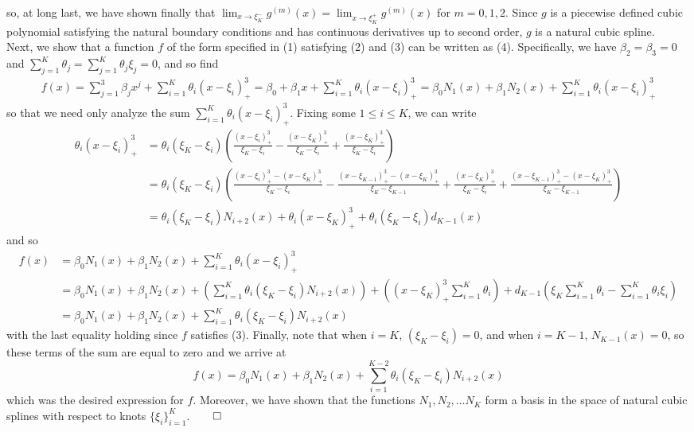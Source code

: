 \documentclass[10pt]{article}
\newcommand{\bp}[1]{\left({#1}\right)}
\newcommand{\1}[1]{\mathbbm{1}_{#1}}
\begin{document}
    so, at long last, we have shown finally that $\lim_{x\rightarrow\xi_K^-}g^{(m)}(x)=\lim_{x\rightarrow\xi_K^+}g^{(m)}(x)$ for $m=0,1,2$. Since $g$ is a piecewise defined cubic polynomial satisfying the natural boundary conditions and has continuous derivatives up to second order, $g$
    is a natural cubic spline.\\[5pt]
    Next, we show that a function $f$ of the form specified in (1) satisfying (2) and (3) can be written as (4). Specifically, we have $\beta_2=\beta_3=0$ and $\sum_{j=1}^K\theta_j=\sum_{j=1}^K\theta_j\xi_j=0$, and so find
    \begin{align*}
        f(x)=\sum_{j=1}^3\beta_jx^j+\sum_{i=1}^K\theta_i(x-\xi_i)^3_+=\beta_0+\beta_1x+\sum_{i=1}^K\theta_i(x-\xi_i)^3_+=\beta_0N_1(x)+\beta_1N_2(x)+\sum_{i=1}^K\theta_i(x-\xi_i)^3_+
    \end{align*}
    so that we need only analyze the sum $\sum_{i=1}^K\theta_i(x-\xi_i)^3_+$. Fixing some $1\leq i\leq K$, we can write
    \begin{align*}
        \theta_i(x-\xi_i)^3_+&=\theta_i(\xi_K-\xi_i)\bp{\frac{(x-\xi_i)^3_+}{\xi_K-\xi_i}-\frac{(x-\xi_K)^3_+}{\xi_K-\xi_{i}}+\frac{(x-\xi_K)^3_+}{\xi_K-\xi_i}}\\
        &=\theta_i(\xi_K-\xi_i)\bp{\frac{(x-\xi_i)^3_+-(x-\xi_K)^3_+}{\xi_K-\xi_i}-\frac{(x-\xi_{K-1})^3_+-(x-\xi_K)^3_+}{\xi_K-\xi_{K-1}}+\frac{(x-\xi_K)^3_+}{\xi_K-\xi_i}+\frac{(x-\xi_{K-1})^3_+-(x-\xi_K)^3_+}{\xi_K-\xi_{K-1}}}\\
        &=\theta_i(\xi_K-\xi_i)N_{i+2}(x)+\theta_i(x-\xi_K)^3_++\theta_i(\xi_K-\xi_i)d_{K-1}(x)
    \end{align*}
    and so
    \begin{align*}
        f(x)&=\beta_0N_1(x)+\beta_1N_2(x)+\sum_{i=1}^K\theta_i(x-\xi_i)^3_+\\
        &=\beta_0N_1(x)+\beta_1N_2(x)+\bp{\sum_{i=1}^K\theta_i(\xi_K-\xi_i)N_{i+2}(x)}+\bp{(x-\xi_K)^3_+\sum_{i=1}^K\theta_i}+d_{K-1}\bp{\xi_K\sum_{i=1}^K\theta_i-\sum_{i=1}^K\theta_i\xi_i}\\
        &=\beta_0N_1(x)+\beta_1N_2(x)+\sum_{i=1}^K\theta_i(\xi_K-\xi_i)N_{i+2}(x)
    \end{align*}
    with the last equality holding since $f$ satisfies (3). Finally, note that when $i=K$, $(\xi_K-\xi_i)=0$, and when $i=K-1$, $N_{K-1}(x)=0$, so these terms of the sum are equal to zero and we arrive at
    \[f(x)=\beta_0N_1(x)+\beta_1N_2(x)+\sum_{i=1}^{K-2}\theta_i(\xi_K-\xi_i)N_{i+2}(x)\]
    which was the desired expression for $f$. Moreover, we have shown that the functions $N_1,N_2,\dots N_K$ form a basis in the space of natural cubic splines with respect to knots $\{\xi_i\}_{i=1}^K$.\hfill{$\qed$}
\end{document}
